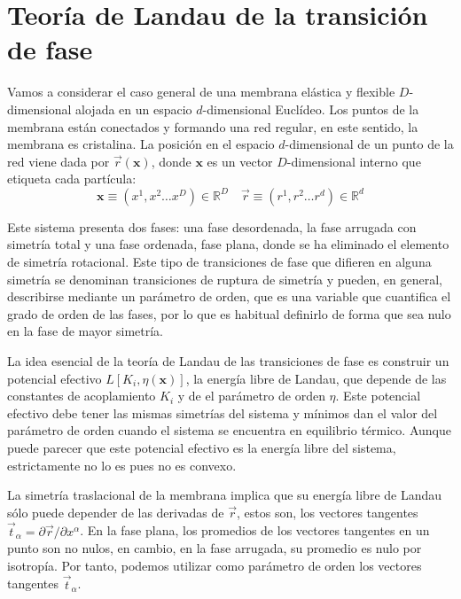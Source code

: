 \chapter{Teoría de Landau de la transición de fase}

Vamos a considerar el caso general de una membrana elástica y flexible
$D$-dimensional alojada en un espacio $d$-dimensional Euclídeo. Los puntos
de la membrana están conectados y formando una red regular, en este
sentido, la membrana es cristalina. La posición en el espacio $d$-dimensional
de un punto de la red viene dada por $\vec{r}(\mathbf{x})$, donde $\mathbf{x}$
es un vector $D$-dimensional interno que etiqueta cada partícula:
$$\mathbf{x}\equiv (x^1,x^2 \dots x^D)\in \mathbb{R}^D \quad \vec{r}\equiv (r^1,r^2 \dots r^d)\in \mathbb{R}^d$$

Este sistema presenta dos fases: una fase desordenada, la fase arrugada con
simetría total y una fase ordenada, fase plana, donde se ha eliminado el
elemento de simetría rotacional. Este tipo de transiciones de fase que
difieren en alguna simetría se denominan transiciones de ruptura de simetría y
pueden, en general, describirse mediante un parámetro de orden, que es una
variable que cuantifica el grado de orden de las fases, por lo que es habitual
definirlo de forma que sea nulo en la fase de mayor simetría.

La idea esencial de la teoría de Landau de las transiciones de fase es
construir un potencial efectivo $L[K_i,\eta(\mathbf{x})]$, la energía libre de
Landau, que depende de las constantes de acoplamiento $K_i$ y de el parámetro
de orden $\eta$. Este potencial efectivo debe tener las mismas simetrías del
sistema y mínimos dan el valor del parámetro de orden cuando el sistema se
encuentra en equilibrio térmico. Aunque puede parecer que este
potencial efectivo es la energía libre del sistema, estrictamente no
lo es pues no es convexo.

La simetría traslacional de la membrana implica que su energía libre de Landau
sólo puede depender de las derivadas de $\vec{r}$, estos son, los vectores
tangentes $\vec{t}_{\alpha}=\partial \vec{r}/\partial x^{\alpha} $. En la fase
plana, los promedios de los vectores tangentes en un punto son no nulos, en
cambio, en la fase arrugada, su promedio es nulo por isotropía. Por tanto,
podemos utilizar como  parámetro de orden los vectores tangentes
$\vec{t}_{\alpha}$.

